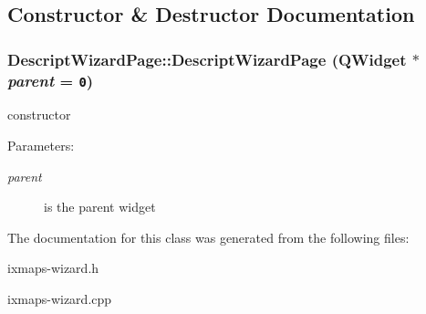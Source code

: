 \subsection{Constructor \& Destructor Documentation}
\hypertarget{classDescriptWizardPage_b86921ecc720516df636de3be65a0e92}{
\subsubsection[DescriptWizardPage]{\setlength{\rightskip}{0pt plus 5cm}DescriptWizardPage::DescriptWizardPage (QWidget $\ast$ {\em parent} = {\tt 0})}}
\label{classDescriptWizardPage_b86921ecc720516df636de3be65a0e92}


constructor \begin{Desc}
\item[Parameters:]
\begin{description}
\item[{\em parent}]is the parent widget \end{description}
\end{Desc}


The documentation for this class was generated from the following files:\begin{CompactItemize}
\item 
ixmaps-wizard.h\item 
ixmaps-wizard.cpp\end{CompactItemize}
